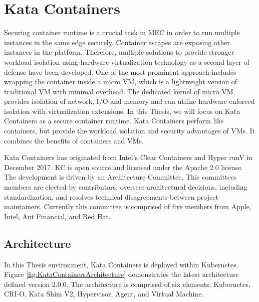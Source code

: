 \chapter{Kata Containers}
\label{chapter:katacontainers}

Securing container runtime is a crucial task in MEC in order to run multiple instances in the same edge securely. Container escapes are exposing other instances in the platform. Therefore, multiple solutions to provide stronger workload isolation using hardware virtualization technology as a second layer of defense have been developed. One of the most prominent approach includes wrapping the container inside a micro VM, which is a lightweight version of traditional VM with minimal overhead. The dedicated kernel of micro VM, provides isolation of network, I/O and memory and can utilize hardware-enforced isolation with virtualization extensions. In this Thesis, we will focus on Kata Containers as a secure container runtime. Kata Containers perform like containers, but provide the workload isolation and security advantages of VMs. It combines the benefits of containers and VMs. \cite{KataContainers}

Kata Containers has originated from Intel's Clear Containers \cite{ClearContainers} and Hyper runV \cite{runV} in December 2017. KC is open source and licensed under the Apache 2.0 license. The development is driven by an Architecture Committee. This committees members are elected by contributors, oversees architectural decisions, including standardization, and resolves technical disagreements between project maintainers. Currently this committee is comprised of five members from Apple, Intel, Ant Financial, and Red Hat. \cite{KataContainersGovernance} \cite{KataContainers}

\section{Architecture}

In this Thesis environment, Kata Containers is deployed within Kubernetes. Figure \ref{fig:KataContainersArchitecture} demonstrates the latest architecture defined version 2.0.0. The architecture is comprised of six elements: Kubernetes, CRI-O, Kata Shim V2, Hypervisor, Agent, and Virtual Machine.

